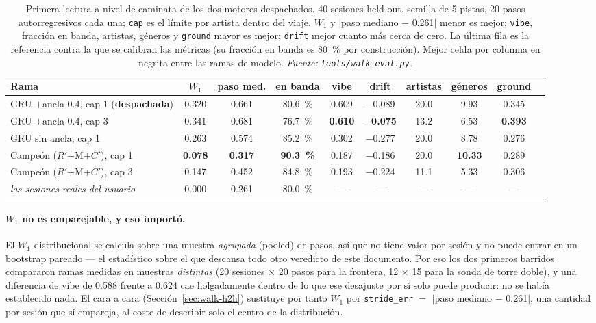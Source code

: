 \documentclass[11pt]{article}
\newcommand{\best}[1]{\textbf{#1}}
\newcommand{\Rp}{\ensuremath{R'}}
\newcommand{\Cp}{\ensuremath{C'}}
\begin{document}
\begin{table}[ht]
  \centering
  \caption{Primera lectura a nivel de caminata de los dos motores despachados.
  \num{40} sesiones held-out, semilla de 5 pistas, \num{20} pasos
  autorregresivos cada una; \texttt{cap} es el límite por artista dentro del
  viaje. $W_1$ y $|$paso mediano $-$ \num{0.261}$|$ menor es mejor;
  \texttt{vibe}, fracción en banda, artistas, géneros y \texttt{ground} mayor es
  mejor; \texttt{drift} mejor cuanto más cerca de cero. La última fila es la
  referencia contra la que se calibran las métricas (su fracción en banda es
  \SI{80}{\percent} por construcción). Mejor celda por columna en negrita entre
  las ramas de modelo. \emph{Fuente: \texttt{tools/walk\_eval.py}.}}
  \label{tab:walk-arms}
  {\footnotesize\setlength{\tabcolsep}{4pt}\begin{tabular}{lccccccccc}
    \toprule
    Rama & $W_1$ & paso med. & en banda & vibe & drift & artistas & géneros & ground \\
    \midrule
    GRU $+$ancla \num{0.4}, cap 1 (\textbf{despachada}) & 0.320 & 0.661 & \SI{80.6}{\percent} & 0.609 & $-$0.089 & 20.0 & 9.93 & 0.345 \\
    GRU $+$ancla \num{0.4}, cap 3 & 0.341 & 0.681 & \SI{76.7}{\percent} & \best{0.610} & \best{$-$0.075} & 13.2 & 6.53 & \best{0.393} \\
    GRU sin ancla, cap 1 & 0.263 & 0.574 & \SI{85.2}{\percent} & 0.302 & $-$0.277 & 20.0 & 8.78 & 0.276 \\
    Campeón (\Rp+M+\Cp), cap 1 & \best{0.078} & \best{0.317} & \best{\SI{90.3}{\percent}} & 0.187 & $-$0.186 & 20.0 & \best{10.33} & 0.289 \\
    Campeón (\Rp+M+\Cp), cap 3 & 0.147 & 0.452 & \SI{84.8}{\percent} & 0.193 & $-$0.224 & 11.1 & 5.33 & 0.306 \\
    \midrule
    \emph{las sesiones reales del usuario} & 0.000 & 0.261 & \SI{80.0}{\percent} & --- & --- & --- & --- & --- \\
    \bottomrule
  \end{tabular}}
\end{table}

\paragraph{$W_1$ no es emparejable, y eso importó.} El $W_1$ distribucional se
calcula sobre una muestra \emph{agrupada} (pooled) de pasos, así que no tiene
valor por sesión y no puede entrar en un bootstrap pareado --- el estadístico
sobre el que descansa todo otro veredicto de este documento. Por eso los dos
primeros barridos compararon ramas medidas en muestras \emph{distintas} (20
sesiones $\times$ 20 pasos para la frontera, 12 $\times$ 15 para la sonda de
torre doble), y una diferencia de vibe de \num{0.588} frente a \num{0.624} cae
holgadamente dentro de lo que ese desajuste por sí solo puede producir: no se
había establecido nada. El cara a cara (Sección~\ref{sec:walk-h2h}) sustituye
por tanto $W_1$ por \texttt{stride\_err} $=$ $|$paso mediano $-$ \num{0.261}$|$,
una cantidad por sesión que sí empareja, al coste de describir solo el centro de
la distribución.
\end{document}
